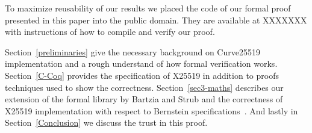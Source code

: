 To maximize reusability of our results we placed the code of our formal proof
presented in this paper into the public domain. They are available at XXXXXXX
with instructions of how to compile and verify our proof.

Section~\ref{preliminaries} give the necessary background on Curve25519
implementation and a rough understand of how formal verification works.
Section~\ref{C-Coq} provides the specification of X25519 in addition to proofs
techniques used to show the correctness.
Section~\ref{sec3-maths} describes our extension of the formal library by Bartzia
and Strub and the correctness of X25519 implementation with respect to Bernstein
specifications~\cite{Ber14}.
And lastly in Section~\ref{Conclusion} we discuss the trust in this proof.



%
%
